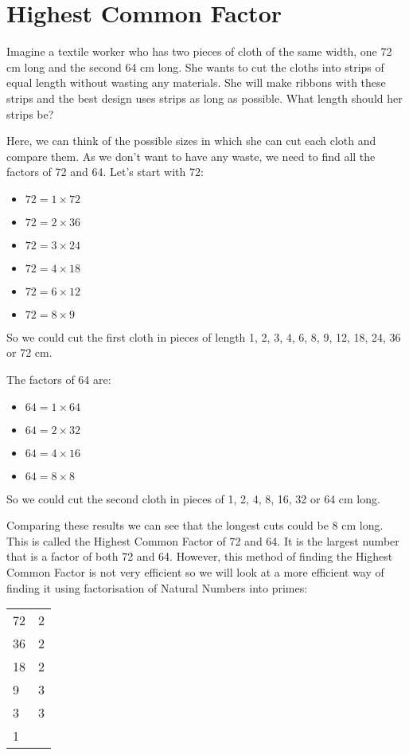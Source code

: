 \documentclass[11pt, oneside]{article}
\theoremstyle{definition}
\begin{document}
\section{Highest Common Factor}

Imagine a textile worker who has two pieces of cloth of the same width, one 72 cm long and the second 64 cm long. She wants to cut the cloths into strips of equal length without wasting any materials. She will make ribbons with these strips and the best design uses strips as long as possible. What length should her strips be? 

Here, we can think of the possible sizes in which she can cut each cloth and compare them. As we don't want to have any waste, we need to find all the factors of 72 and 64. Let's start with 72:

\begin{itemize}
\item $72 = 1\times 72$
\item $72 = 2 \times 36$
\item $72 = 3 \times 24$
\item $72 = 4 \times 18$
\item $72 = 6\times 12$
\item $72 = 8\times 9$
\end{itemize} 
So we could cut the first cloth in pieces of length 1, 2, 3, 4, 6, 8, 9, 12, 18, 24, 36 or 72 cm.

The factors of 64 are:
\begin{itemize}
\item $64 = 1\times 64$
\item $64 = 2 \times 32$
\item $64 = 4 \times 16$
\item $64 = 8\times 8$
\end{itemize} 
So we could cut the second cloth in pieces of 1, 2, 4, 8, 16, 32 or 64 cm long.

Comparing these results we can see that the longest cuts could be 8 cm long. This is called the Highest Common Factor of 72 and 64. It is the largest number that is a factor of both 72 and 64. However, this method of finding the Highest Common Factor is not very efficient so we will look at a more efficient way of finding it using factorisation of Natural Numbers into primes:

\begin{tabular}{ p{0.5cm} | p{1.5cm}}
72 & 2  \\
36 & 2  \\
18 & 2  \\
9 & 3  \\
3 & 3 \\
1 &  
\end{tabular}
\end{document}

